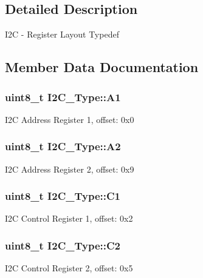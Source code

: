 \subsection{Detailed Description}
I2C -\/ Register Layout Typedef 

\subsection{Member Data Documentation}
\subsubsection[{\texorpdfstring{A1}{A1}}]{ uint8\+\_\+t I2\+C\+\_\+\+Type\+::\+A1}\hypertarget{structI2C__Type_a5f4adcc09ad475b811d37f1462e82c74}{}\label{structI2C__Type_a5f4adcc09ad475b811d37f1462e82c74}
I2C Address Register 1, offset\+: 0x0 
\subsubsection[{\texorpdfstring{A2}{A2}}]{ uint8\+\_\+t I2\+C\+\_\+\+Type\+::\+A2}\hypertarget{structI2C__Type_a25bd966a745df11edd849836e17a2457}{}\label{structI2C__Type_a25bd966a745df11edd849836e17a2457}
I2C Address Register 2, offset\+: 0x9 
\subsubsection[{\texorpdfstring{C1}{C1}}]{ uint8\+\_\+t I2\+C\+\_\+\+Type\+::\+C1}\hypertarget{structI2C__Type_a8dc1b42eab0063baa1ddb76888a51bd3}{}\label{structI2C__Type_a8dc1b42eab0063baa1ddb76888a51bd3}
I2C Control Register 1, offset\+: 0x2 
\subsubsection[{\texorpdfstring{C2}{C2}}]{ uint8\+\_\+t I2\+C\+\_\+\+Type\+::\+C2}\hypertarget{structI2C__Type_a1cc523ad84714ff9fe3f28a9b2edccf7}{}\label{structI2C__Type_a1cc523ad84714ff9fe3f28a9b2edccf7}
I2C Control Register 2, offset\+: 0x5 

